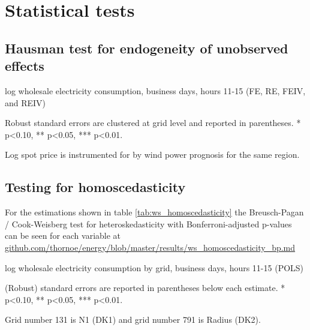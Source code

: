 \section{Statistical tests}
\label{app:statistical_tests}

\subsection{Hausman test for endogeneity of unobserved effects}
\label{app:hausman}
\begin{table}[H]
\centering
\begin{threeparttable}
  \caption{log wholesale electricity consumption, business days, hours 11-15 (FE, RE, FEIV, and REIV)}
  \label{tab:ws_fe}
  \footnotesize
    
    \begin{tablenotes}
    \item Robust standard errors are clustered at grid level and reported in parentheses. * p<0.10, ** p<0.05, *** p<0.01.
    \item Log spot price is instrumented for by wind power prognosis for the same region.
  \end{tablenotes}
\end{threeparttable}
\end{table}

\clearpage

\subsection{Testing for homoscedasticity}
\label{app:homoscedasticity}
For the estimations shown in table \ref{tab:ws_homoscedasticity} the Breusch-Pagan / Cook-Weisberg test for heteroskedasticity with Bonferroni-adjusted p-values can be seen for each variable at \href{https://github.com/thornoe/energy/blob/master/results/ws_homoscedasticity_bp.md}{github.com/thornoe/energy/blob/master/results/ws\_homoscedasticity\_bp.md}
\begin{table}[H]
\centering
\begin{threeparttable}
  \caption{log wholesale electricity consumption by grid, business days, hours 11-15 (POLS)}
  \label{tab:ws_homoscedasticity}
  \footnotesize
    
    \begin{tablenotes}
    \item (Robust) standard errors are reported in parentheses below each estimate. * p<0.10, ** p<0.05, *** p<0.01.
    \item Grid number 131 is N1 (DK1) and grid number 791 is Radius (DK2).
  \end{tablenotes}
\end{threeparttable}
\end{table}

